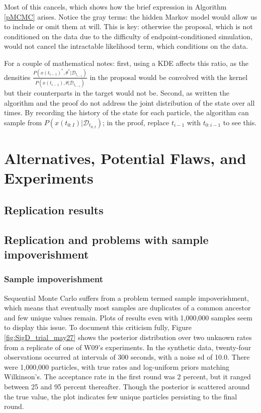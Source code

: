 \documentclass{article}
\begin{document}
Most of this cancels, which shows how the brief expression in Algorithm \ref{pMCMC} arises. Notice the gray terms: the hidden Markov model would allow us to include or omit them at will. This is key: otherwise the proposal, which is not conditioned on the data due to the difficulty of endpoint-conditioned simulation, would not cancel the intractable likelihood term, which conditions on the data.

 For a couple of mathematical notes: first, using a KDE affects this ratio, as the densities $\frac{P(x(t_{i-1})^*,\theta^*| \mathcal{D}_{t_{i-1}})}{P(x(t_{i-1}), \theta| \mathcal{D}_{t_{i-1}})}$ in the proposal would be convolved with the kernel but their counterparts in the target would not be. Second, as written the algorithm and the proof do not address the joint distribution of the state over all times. By recording the history of the state for each particle, the algorithm can sample from $P(x(t_{0:I})|\mathcal{D}_{t_{0:I}})$; in the proof, replace $t_{i-1}$ with $t_{0:i-1}$ to see this. 

\section{Alternatives, Potential Flaws, and Experiments}
\subsection{Replication results}

\subsection{Replication and problems with sample impoverishment}

\subsubsection{Sample impoverishment}
Sequential Monte Carlo suffers from a problem termed sample impoverishment, which means that eventually most samples are duplicates of a common ancestor and few unique values remain. Plots of results even with 1,000,000 samples seem to display this issue. To document this criticism fully, Figure \ref{fig:SigD_trial_may27} shows the posterior distribution over two unknown rates from a replicate of one of W09's experiments. In the synthetic data, twenty-four observations occurred at intervals of 300 seconds, with a noise sd of 10.0. There were 1,000,000 particles, with true rates and log-uniform priors matching Wilkinson's. The acceptance rate in the first round was 2 percent, but it ranged between 25 and 95 percent thereafter. Though the posterior is scattered around the true value, the plot indicates few unique particles persisting to the final round. 
\end{document}

